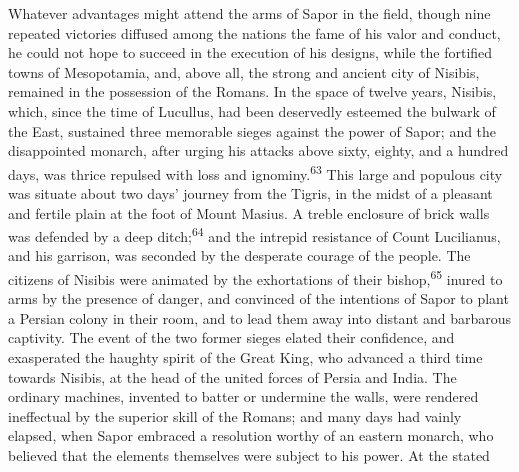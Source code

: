 


Whatever advantages might attend the arms of Sapor in the field,
though nine repeated victories diffused among the nations the
fame of his valor and conduct, he could not hope to succeed in
the execution of his designs, while the fortified towns of
Mesopotamia, and, above all, the strong and ancient city of
Nisibis, remained in the possession of the Romans. In the space
of twelve years, Nisibis, which, since the time of Lucullus, had
been deservedly esteemed the bulwark of the East, sustained three
memorable sieges against the power of Sapor; and the disappointed
monarch, after urging his attacks above sixty, eighty, and a
hundred days, was thrice repulsed with loss and ignominy.\textsuperscript{63} This
large and populous city was situate about two days’ journey from
the Tigris, in the midst of a pleasant and fertile plain at the
foot of Mount Masius. A treble enclosure of brick walls was
defended by a deep ditch;\textsuperscript{64} and the intrepid resistance of Count
Lucilianus, and his garrison, was seconded by the desperate
courage of the people. The citizens of Nisibis were animated by
the exhortations of their bishop,\textsuperscript{65} inured to arms by the
presence of danger, and convinced of the intentions of Sapor to
plant a Persian colony in their room, and to lead them away into
distant and barbarous captivity. The event of the two former
sieges elated their confidence, and exasperated the haughty
spirit of the Great King, who advanced a third time towards
Nisibis, at the head of the united forces of Persia and India.
The ordinary machines, invented to batter or undermine the walls,
were rendered ineffectual by the superior skill of the Romans;
and many days had vainly elapsed, when Sapor embraced a
resolution worthy of an eastern monarch, who believed that the
elements themselves were subject to his power. At the stated
